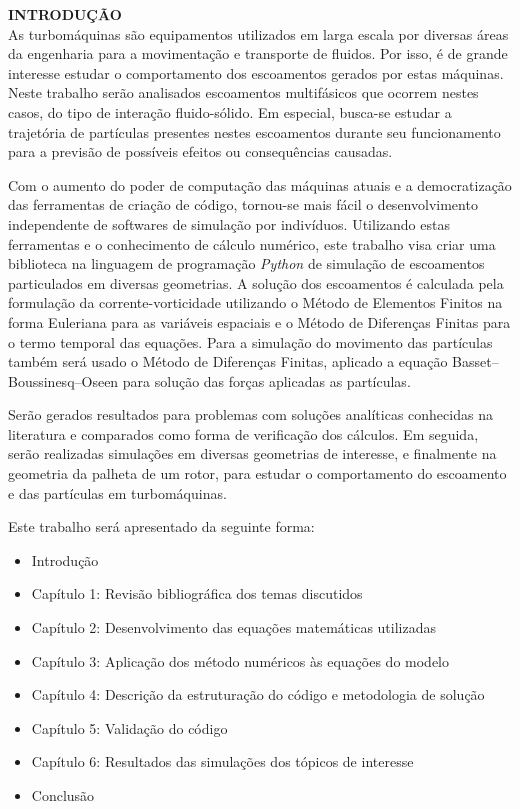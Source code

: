 \noindent\textbf{INTRODUÇÃO}
\\

As turbomáquinas são equipamentos utilizados em larga escala por diversas áreas da engenharia para a movimentação e transporte de fluidos.
Por isso, é de grande interesse estudar o comportamento dos escoamentos gerados por estas máquinas.
Neste trabalho serão analisados escoamentos multifásicos que ocorrem nestes casos, do tipo de interação fluido-sólido.
Em especial, busca-se estudar a trajetória de partículas presentes nestes escoamentos durante seu funcionamento para a previsão de possíveis efeitos ou consequências causadas.

Com o aumento do poder de computação das máquinas atuais e a democratização das ferramentas de criação de código, tornou-se mais fácil o desenvolvimento independente de softwares de simulação por indivíduos.
Utilizando estas ferramentas e o conhecimento de cálculo numérico, este trabalho visa criar uma biblioteca na linguagem de programação \textit{Python} de simulação de escoamentos particulados em diversas geometrias.
A solução dos escoamentos é calculada pela formulação da corrente-vorticidade utilizando o Método de Elementos Finitos na forma Euleriana para as variáveis espaciais e o Método de Diferenças Finitas para o termo temporal das equações.
Para a simulação do movimento das partículas também será usado o Método de Diferenças Finitas, aplicado a equação Basset–Boussinesq–Oseen para solução das forças aplicadas as partículas.

Serão gerados resultados para problemas com soluções analíticas conhecidas na literatura e comparados como forma de verificação dos cálculos.
Em seguida, serão realizadas simulações em diversas geometrias de interesse, e finalmente na geometria da palheta de um rotor, para estudar o comportamento do escoamento e das partículas em turbomáquinas.

Este trabalho será apresentado da seguinte forma:
\begin{itemize}
	\item Introdução
	\item Capítulo 1: Revisão bibliográfica dos temas discutidos
	\item Capítulo 2: Desenvolvimento das equações matemáticas utilizadas
	\item Capítulo 3: Aplicação dos método numéricos às equações do modelo
	\item Capítulo 4: Descrição da estruturação do código e metodologia de solução
	\item Capítulo 5: Validação do código
	\item Capítulo 6: Resultados das simulações dos tópicos de interesse
	\item Conclusão
\end{itemize}
